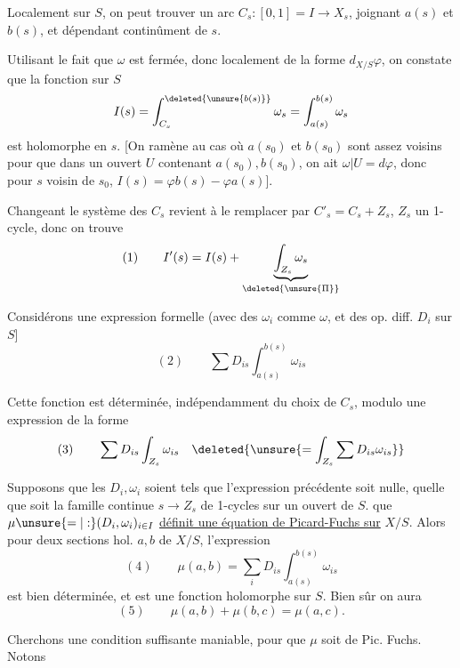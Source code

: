 Localement sur $S$, on peut trouver un arc   $C_s:[0,1]=I\longrightarrow X_s$, joignant $a(s)$ et $b(s)$, et dépendant continûment de $s$.

Utilisant le fait que $\omega$ est fermée, donc localement de la forme $d_{X/S}\varphi$, on constate que la fonction sur $S$
\[
I(s)=\int_{C_s}^{\deleted{\unsure{b(s)}}}\omega_s=\int_{a(s)}^{b(s)}\omega_s
\]
est holomorphe en $s$. [On  ramène au cas où  $a(s_0)$ et $b(s_0)$ sont assez voisins pour que dans un ouvert $U$ contenant $a(s_0),b(s_0)$, on ait $\omega|U=d\varphi$, donc pour $s$ voisin de $s_0$, $I(s)=\varphi b(s)-\varphi a(s)$].

Changeant le système des $C_s$ revient à le remplacer par $C'_s=C_s+Z_s$, $Z_s$ un 1-cycle, donc on trouve
\[
(1)\qquad I'(s)=I(s)+\underbrace{\int_{Z_s}\omega_s}_{\deleted{\unsure{\Pi}}}
\]

Considérons une expression formelle (avec des $\omega_i$ comme $\omega$, et des op. diff.  $D_i$ sur $S$]
\[
(2)\qquad \sum D_{is}\int_{a(s)}^{b(s)}\omega_{is}
\]

Cette fonction est déterminée, indépendamment du choix de $C_s$, modulo une expression de la forme
\[
(3)\qquad \sum D_{is}\int_{Z_s}\omega_{is}\quad
\deleted{\unsure{=\int_{Z_s}\sum D_{is}\omega_{is}}}
\]

Supposons que les $D_i,\omega_i$ soient tels que l'expression précédente soit nulle, quelle que soit  la famille continue $s\longrightarrow Z_s$ de 1-cycles  sur un ouvert de $S$.   que  $\mu\unsure{=|:}(D_i,\omega_i)_{i\in I}$ \uline{définit une équation de Picard-Fuchs sur} $X/S$. Alors pour deux sections hol.  $a,b$ de $X/S$, l'expression
\[
(4)\qquad \mu(a,b)=\sum_i D_{is}\int_{a(s)}^{b(s)}\omega_{is}
\]
est bien déterminée, et est une fonction holomorphe sur $S$. Bien sûr on aura
\[
(5)\qquad \mu(a,b)+\mu(b,c)=\mu(a,c).
\]

Cherchons une condition suffisante maniable,    pour que $\mu$ soit de Pic. Fuchs. Notons

